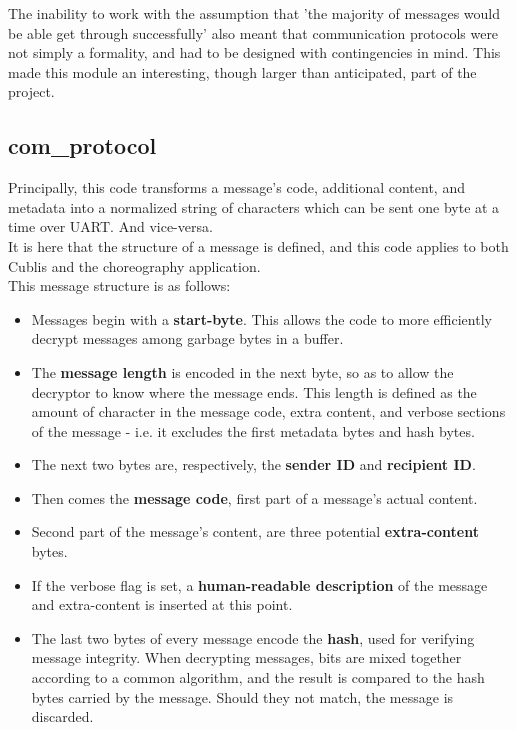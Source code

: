 The inability to work with the assumption that 'the majority of messages would be able get through successfully' also meant that communication protocols were not simply a formality, and had to be designed with contingencies in mind. This made this module an interesting, though larger than anticipated, part of the project.

\subsection{com\_protocol}

Principally, this code transforms a message's code, additional content, and metadata into a normalized string of characters which can be sent one byte at a time over UART. And vice-versa.\\

It is here that the structure of a message is defined, and this code applies to both Cublis and the choreography application.\\

This message structure is as follows:
\begin{itemize}
\item[] Messages begin with a \textbf{start-byte}. This allows the code to more efficiently decrypt messages among garbage bytes in a buffer.
\item[] The \textbf{message length} is encoded in the next byte, so as to allow the decryptor to know where the message ends. This length is defined as the amount of character in the message code, extra content, and verbose sections of the message - i.e. it excludes the first metadata bytes and hash bytes.
\item[] The next two bytes are, respectively, the \textbf{sender ID} and \textbf{recipient ID}.
\item[] Then comes the \textbf{message code}, first part of a message's actual content.
\item[] Second part of the message's content, are three potential \textbf{extra-content} bytes.
\item[] If the verbose flag is set, a \textbf{human-readable description} of the message and extra-content is inserted at this point.
\item[] The last two bytes of every message encode the \textbf{hash}, used for verifying message integrity. When decrypting messages, bits are mixed together according to a common algorithm, and the result is compared to the hash bytes carried by the message. Should they not match, the message is discarded.
\end{itemize}

